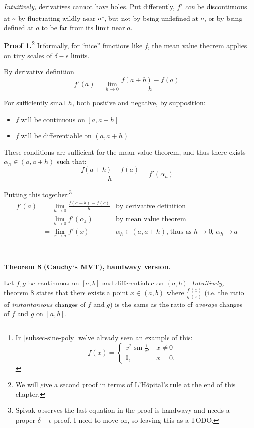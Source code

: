 \textit{Intuitively,} derivatives cannot have holes. Put differently,
$f'$ \textit{can} be discontinuous at $a$ by fluctuating wildly near
$a$\footnote{In \ref{subsec-sine-poly} we've already seen an example
  of this:
  \[f(x)=\begin{cases}
    x^2\sin \frac{1}{x},&x\neq0\\
    0,&x=0.
  \end{cases}\]}, but
not by being undefined at $a$, or by being defined at $a$ to be far from its limit
near $a$.

\vs

\textbf{Proof 1.}\footnote{We will give a second proof in terms of
  L'H\^opital's rule at the end of this chapter.} Informally, for
``nice'' functions like $f$, the mean value theorem applies on tiny
scales of $\delta-\epsilon$ limits.

\vs

By derivative definition
\[f'(a)=\lim_{h\to 0}\frac{f(a+h)-f(a)}{h}\]

For sufficiently small $h$, both positive and negative, by supposition:
\begin{itemize}
\item $f$ will be continuous on $[a,a+h]$
\item $f$ will be differentiable on $(a,a+h)$
\end{itemize}

These conditions are sufficient for the mean value theorem, and thus
there exists $\alpha_h\in(a, a+h)$ such that:
\[\frac{f(a+h)-f(a)}{h}=f'(\alpha_h)\]

Putting this together:\footnote{Spivak observes the last equation in
  the proof is handwavy and needs a proper $\delta-\epsilon$ proof. I need to move
  on, so leaving this as a TODO.}
\begin{align*}
  f'(a)&=\lim_{h\to0}\frac{f(a+h)-f(a)}{h}&\text{by derivative definition}\\
       &=\lim_{h\to0}f'(\alpha_h)&\text{by mean value theorem}\\
       &=\lim_{x\to a}f'(x)&\text{$\alpha_h\in(a,a+h)$, thus as $h\to0$, $\alpha_h\to a$}
\end{align*}

\vs---\vs

\textbf{Theorem 8 (Cauchy's MVT), handwavy version.}

\vs

Let $f,g$ be continuous on $[a,b]$ and differentiable on $(a,b)$.
\textit{Intuitively,} theorem 8 states that there exists a point
$x\in(a,b)$ where $\frac{f'(x)}{g'(x)}$ (i.e. the ratio of
\textit{instantaneous} changes of $f$ and $g$) is the same as the
ratio of \textit{average} changes of $f$ and $g$ on $[a,b]$.

